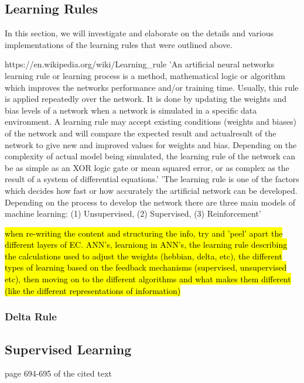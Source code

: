 \subsection{Learning Rules}
In this section, we will investigate and elaborate on the details and various implementations of the learning rules that were outlined above.

https://en.wikipedia.org/wiki/Learning_rule
'An artificial neural networks learning rule or learning process is a method, mathematical logic or algorithm which improves the networks performance and/or training time. Usually, this rule is applied repeatedly over the network. It is done by updating the weights and bias levels of a network when a network is simulated in a specific data environment. A learning rule may accept existing conditions (weights and biases) of the network and will compare the expected result and actualresult of the network to give new and improved values for weights and bias. Depending on the complexity of actual model being simulated, the learning rule of the network can be as simple as an XOR logic gate or mean squared error, or as complex as the result of a system of differential equations.'
'The learning rule is one of the factors which decides how fast or how accurately the artificial network can be developed. Depending on the process to develop the network there are three main models of machine learning: (1) Unsupervised, (2) Supervised, (3) Reinforcement'

\hl{when re-writing the content and structuring the info, try and 'peel' apart the different layers of EC. ANN's, learniong in ANN's, the learning rule describing the calculations used to adjust the weights (hebbian, delta, etc), the different types of learning based on the feedback mechanisms (supervised, unsupervised etc), then moving on to the different algorithms and what makes them different (like the different representations of information)}

\subsubsection{Delta Rule}



\subsection{Supervised Learning}

page 694-695 of the cited text

